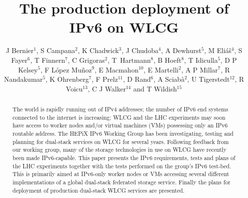 \documentclass[a4paper]{jpconf}
\begin{document}
\title{The production deployment of IPv6 on WLCG}

\author{J Bernier$^1$, S Campana$^2$, K Chadwick$^3$, J Chudoba$^4$, 
        A Dewhurst$^5$, M Eli\'a\v s$^4$, S Fayer$^6$, T Finnern$^7$,
        C Grigoras$^2$, T~Hartmann$^8$, B Hoeft$^8$, T Idiculla$^5$, D P Kelsey$^5$,  
        F L\'opez Mu\~noz$^9$, E Macmahon$^{10}$, E Martelli$^2$, A P Millar$^7$, R Nandakumar$^5$, 
        K Ohrenberg$^7$, F Prelz$^{11}$, D Rand$^6$, 
        A Sciab\`a$^2$, U Tigerstedt$^{12}$, R Voicu$^{13}$, 
        C J Walker$^{14}$ and T Wildish$^{15}$}

\address{$^1$ IN2P3 Computing Center, 21 Avenue Pierre de Coubertin, F-69627 Villeurbanne Cedex, France}
\address{$^2$ CERN, CH-1211 Gen\`eve 23, Switzerland}
\address{$^3$ Fermi National Accelerator Laboratory, Batavia, Il 60510, U.S.A.}
\address{$^4$ Institute of Physics, Academy of Sciences of the Czech Republic Na Slovance 2 182 21 Prague 8, Czech Republic}
\address{$^5$ STFC Rutherford Appleton Laboratory, Harwell Oxford, Didcot, Oxfordshire OX11 0QX, United Kingdom}
\address{$^6$ Imperial College London, South Kensington Campus, London SW7 2AZ, United Kingdom}
\address{$^7$ Deutsches Elektronen-Synchrotron, Notkestra\ss e 85, D-22607 Hamburg, Germany}
\address{$^8$ Karlsruher Institut f\"ur Technologie, Hermann-von-Helmholtz-Platz 1, D-76344 Eggenstein-Leopoldshafen, Germany}
\address{$^9$ Port d'Informaci\'o Cient\'ifica, Campus UAB, Edifici D, E-08193 Bellaterra, Spain}
\address{$^{10}$ The University of Oxford, The Department of Physics, Denys Wilkinson Building, Keble Road, Oxford OX1 3RH, United Kingdom}
\address{$^{11}$ INFN, Sezione di Milano, via G. Celoria 16, I-20133 Milano, Italy}
\address{$^{12}$ CSC Tieteen Tietotekniikan Keskus Oy, P.O. Box 405, FI-02101 Espoo, Finland}
\address{$^{13}$ California Institute of Technology, Pasadena, Ca 91125, U.S.A.}
\address{$^{14}$ Queen Mary University of London, Mile End Road, London E1 4NS, United Kingdom}
\address{$^{15}$ Princeton University, Jadwin Hall, Princeton, NJ 08544, U.S.A.}


\begin{abstract}
The world is rapidly running out of IPv4 addresses; the number of IPv6 end systems connected
to the internet is increasing; WLCG and the LHC experiments may soon have access to worker
nodes and/or virtual machines (VMs) possessing only an IPv6 routable address. The HEPiX
IPv6 Working Group has been investigating, testing and
planning for dual-stack services on WLCG for several years. Following feedback from our
working group, many of the storage technologies in use on WLCG have recently been made
IPv6-capable.
This paper presents the IPv6 requirements, tests and plans of the LHC
experiments together with the tests performed on the group's IPv6 test-bed. 
This is primarily aimed at IPv6-only worker nodes or VMs
accessing several different implementations of a global dual-stack federated storage service.
Finally the plans for deployment of production dual-stack WLCG services are presented.
\end{abstract}
\end{document}

